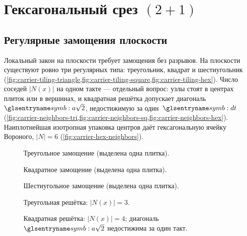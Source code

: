 \section{Гексагональный срез $(2{+}1)$}
\label{sec:hex-slice}

\subsection{Регулярные замощения плоскости}

Локальный закон на плоскости требует замощения без разрывов.
На плоскости существуют ровно три регулярных типа: треугольник, квадрат и шестиугольник
(\cref{fig:carrier-tiling-triangle,fig:carrier-tiling-square,fig:carrier-tiling-hex}).
Число соседей $|N(x)|$ на одном такте --- отдельный вопрос: узлы стоят в центрах плиток
или в вершинах, и квадратная решётка допускает диагональ $\caStepSpace\sqrt{2}$, недостижимую за один~$\htick$
(\cref{fig:carrier-neighbors-tri,fig:carrier-neighbors-sq,fig:carrier-neighbors-hex}).
Наиплотнейшая изотропная упаковка центров даёт гексагональную ячейку Вороного, $|N|=6$
(\cref{fig:carrier-hex-neighbors}).

\begin{figure}[htbp]
  \centering
  
  \caption{Треугольное замощение (выделена одна плитка).}
  \label{fig:carrier-tiling-triangle}
\end{figure}

\begin{figure}[htbp]
  \centering
  
  \caption{Квадратное замощение (выделена одна плитка).}
  \label{fig:carrier-tiling-square}
\end{figure}

\begin{figure}[htbp]
  \centering
  
  \caption{Шестиугольное замощение (выделена одна плитка).}
  \label{fig:carrier-tiling-hex}
\end{figure}

\begin{figure}[htbp]
  \centering
  
  \caption{Треугольная решётка: $|N(x)|=3$.}
  \label{fig:carrier-neighbors-tri}
\end{figure}

\begin{figure}[htbp]
  \centering
  
  \caption{Квадратная решётка: $|N(x)|=4$; диагональ $\caStepSpace\sqrt{2}$ недостижима за один такт.}
  \label{fig:carrier-neighbors-sq}
\end{figure}

